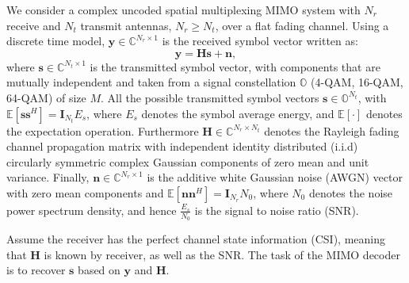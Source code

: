 \documentclass[letterpaper, 10pt, conference]{ieeeconf}
\begin{document}
We consider a complex uncoded spatial multiplexing MIMO system with $N_r$ receive and $N_t$ transmit antennas, $N_{r}\geq N_{t}$, over a flat fading channel. Using a discrete time model, $\mathbf{y}\in\mathbb{C}^{N_{r}\times 1}$ is the received symbol vector written as:
\begin{equation}
\mathbf{y}=\mathbf{H}\mathbf{s}+\mathbf{n},   \label{formula 1}
\end{equation}
where $\mathbf{s}\in \mathbb{C}^{N_{t}\times 1}$ is the transmitted symbol vector, with components that are mutually independent and taken from a signal constellation $\mathbb{O}$ (4-QAM, 16-QAM, 64-QAM) of size $M$. All the possible transmitted symbol vectors $\mathbf{s}\in \mathbb{O}^{N_{t}}$, with $\mathbb{E}[\mathbf{s}\mathbf{s}^{H}]=\mathbf{I}_{N_t}E_{s}$, where $E_{s}$ denotes the symbol average energy, and $\mathbb{E}[\cdot]$ denotes the expectation operation. Furthermore $\mathbf{H}\in \mathbb{C}^{N_{r}\times N_{t}}$ denotes the Rayleigh fading channel propagation matrix with independent identity distributed (i.i.d) circularly symmetric complex Gaussian components of zero mean and unit variance. Finally, $\mathbf{n}\in \mathbb{C}^{N_{r}\times 1}$ is the additive white Gaussian noise (AWGN) vector with zero mean components and $\mathbb{E}[\mathbf{n}\mathbf{n}^{H}]=\mathbf{I}_{N_{r}}N_{0}$, where $N_{0}$ denotes the noise power spectrum density, and hence $\frac{E_{s}}{N_{0}}$ is the signal to noise ratio (SNR). 

Assume the receiver has the perfect channel state information (CSI), meaning that $ \mathbf{H}$ is known by receiver, as well as the SNR. The task of the MIMO decoder is to recover $\mathbf{s}$ based on $\mathbf{y}$ and $\mathbf{H}$.
\end{document}
